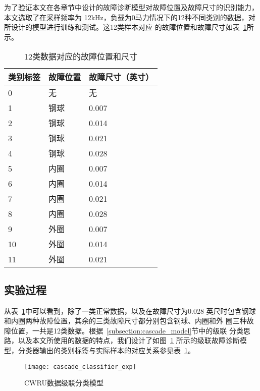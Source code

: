 为了验证本文在各章节中设计的故障诊断模型对故障位置及故障尺寸的识别能力，本文选取了在采样频率为
12kHz，负载为0马力情况下的12种不同类别的数据，对所设计的模型进行训练和测试。这12类样本对应
的故障位置和故障尺寸如表~\ref{tab:class_desc}所示。
\begin{table}[htb]
  \centering
  \begin{minipage}[t]{0.7\linewidth} %
  \caption{12类数据对应的故障位置和尺寸}
  \label{tab:class_desc}
    \begin{tabularx}{\linewidth}{XXX}
      \toprule[1.5pt]
      类别标签 & 故障位置 & 故障尺寸（英寸） \\\midrule[1pt]
      0 & 无 & 无 \\
      1 & 钢球 & 0.007 \\
      2 & 钢球 & 0.014 \\
      3 & 钢球 & 0.021 \\
      4 & 钢球 & 0.028 \\
      5 & 内圈 & 0.007 \\
      6 & 内圈 & 0.014 \\
      7 & 内圈 & 0.021 \\
      8 & 内圈 & 0.028 \\
      9 & 外圈 & 0.007 \\
      10 & 外圈 & 0.014 \\
      11 & 外圈 & 0.021 \\
      \bottomrule[1.5pt]
    \end{tabularx}
  \end{minipage}
\end{table}

\subsection{实验过程}

从表~\ref{tab:class_desc}中可以看到，除了一类正常数据，以及在故障尺寸为0.028
英尺时包含钢球和内圈两种故障位置，其余的三类故障尺寸都分别包含钢球、内圈和外
圈三种故障位置，一共是12类数据。根据~\ref{subsection:cascade_model}节中的级联
分类思路，以及本文所使用的数据的特点，我们设计了如图~\ref{fig:cascade_classifier_exp}
所示的级联故障诊断模型，分类器输出的类别标签与实际样本的对应关系参见表~\ref{tab:class_desc}。
\begin{figure}[ht] %
  \centering
  \texttt{[image: cascade\_classifier\_exp]}
  \caption{CWRU数据级联分类模型}
  \label{fig:cascade_classifier_exp}
\end{figure}


